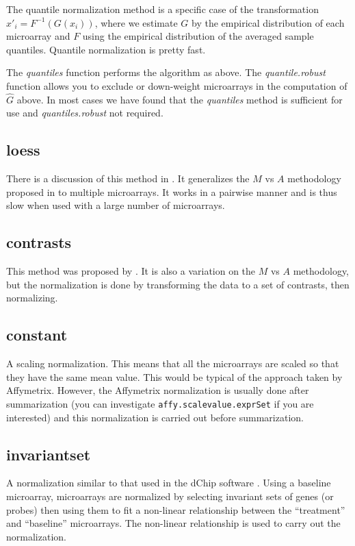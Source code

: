 The quantile normalization method is a specific case of the transformation $x'_{i} = F^{-1}\left(G\left(x_{i}\right)\right)$, where we estimate $G$ by the empirical distribution of each microarray and $F$ using the empirical distribution of the averaged sample quantiles.  Quantile normalization is pretty fast.

The \emph{quantiles} function performs the algorithm as above. The \emph{quantile.robust} function allows you to exclude or down-weight microarrays in the computation of $\hat G$ above. In most cases we have found that the \emph{quantiles} method is sufficient for use and \emph{quantiles.robust} not required.

\subsection{loess}

There is a discussion of this method in \cite{PMID_12538238}. It generalizes the $M$ vs $A$ methodology proposed in \cite{Dudoit:2002} to multiple microarrays. It works in a pairwise manner and is thus slow when used with a large number of microarrays.

\subsection{contrasts}

This method was proposed by \cite{astr:2003}. It is also a variation on the  $M$ vs $A$ methodology, but the normalization is done by transforming the data to a set of contrasts, then normalizing.

\subsection{constant}

A scaling normalization. This means that all the microarrays are scaled so that they have the same mean value. This would be typical of the approach taken by Affymetrix. However, the Affymetrix normalization is usually done after summarization (you can investigate \verb+affy.scalevalue.exprSet+ if you are interested) and this normalization is carried out before summarization.

\subsection{invariantset}

A normalization similar to that used in the dChip software \cite{mbei,dchip}. Using a baseline microarray, microarrays are normalized by selecting invariant sets of genes (or probes) then using them to fit a non-linear relationship between the ``treatment'' and ``baseline'' microarrays. The non-linear relationship is used to carry out the normalization.

